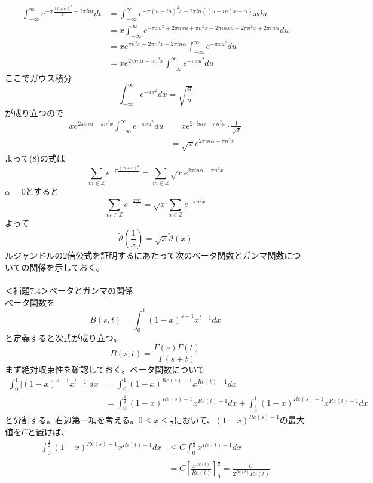 \documentclass{jsarticle}
\begin{document}
\begin{align*}
\int_{-\infty}^{\infty}e^{-\pi\frac{(t+\alpha)^2}{x}-2\pi int}dt&=\int_{-\infty}^{\infty}e^{-\pi(u-in)^{2}x-2\pi in\left\{(u-in)x-\alpha\right\}}xdu\\
&=x\int_{-\infty}^{\infty}e^{-\pi xu^{2}+2\pi nxu+\pi n^{2}x-2\pi inxu-2\pi n^{2}x+2\pi in\alpha}du\\
&=xe^{\pi n^{2}x-2\pi n^{2}x+2\pi in\alpha}\int_{-\infty}^{\infty}e^{-\pi xu^{2}}du\\
&=xe^{2\pi in\alpha-\pi n^{2}x}\int_{-\infty}^{\infty}e^{-\pi xu^{2}}du
\end{align*}
ここでガウス積分
\[\int_{-\infty}^{\infty}e^{-ax^2}dx=\sqrt{\frac{\pi}{a}}\]
が成り立つので
\begin{align*}
xe^{2\pi in\alpha-\pi n^{2}x}\int_{-\infty}^{\infty}e^{-\pi xu^{2}}du&=xe^{2\pi in\alpha-\pi n^{2}x}\cdot\frac{1}{\sqrt{x}}\\
&=\sqrt{x}e^{2\pi in\alpha-\pi n^{2}x}
\end{align*}
よって(8)の式は
\[
\sum_{m\in\mathbb{Z}}e^{-\pi\frac{(m+\alpha)^2}{x}}=\sum_{m\in\mathbb{Z}}\sqrt{x}e^{2\pi in\alpha-\pi n^{2}x}
\]
\(\alpha=0\)とすると
\[\sum_{m\in\mathbb{Z}}e^{-\frac{\pi m^2}{x}}=\sqrt{x}\sum_{n\in\mathbb{Z}}e^{-\pi n^{2}x}\]
よって
\[\tilde{\vartheta}\left(\frac{1}{x}\right)=\sqrt{x}\tilde{\vartheta}(x)\]
ルジャンドルの2倍公式を証明するにあたって次のベータ関数とガンマ関数についての関係を示しておく。\\
\\
＜補題7.4＞ベータとガンマの関係\\
ベータ関数を
\[B(s,t)=\int_{0}^{1}(1-x)^{s-1}x^{t-1}dx\]
と定義すると次式が成り立つ。
\begin{equation}
B(s,t)=\frac{\Gamma(s)\Gamma(t)}{\Gamma(s+t)}
\end{equation}
まず絶対収束性を確認しておく。ベータ関数について\\
\begin{align*}
\int_{0}^{1}\Biggl|(1-x)^{s-1}x^{t-1}\Biggr|dx&=\int_{0}^{1}(1-x)^{Re(s)-1}x^{Re(t)-1}dx\\
&=\int_{0}^{\frac{1}{2}}(1-x)^{Re(s)-1}x^{Re(t)-1}dx+\int_{\frac{1}{2}}^{1}(1-x)^{Re(s)-1}x^{Re(t)-1}dx
\end{align*}
と分割する。右辺第一項を考える。\(0\leq x\leq\frac{1}{2}\)において、\((1-x)^{Re(s)-1}\)の最大値を\(C\)と置けば、
\begin{align*}
\int_{0}^{\frac{1}{2}}(1-x)^{Re(s)-1}x^{Re(t)-1}dx&\leq C\int_{0}^{\frac{1}{2}}x^{Re(t)-1}dx\\
&=C\left[\frac{x^{Re(t)}}{Re(t)}\right]_{0}^{\frac{1}{2}}=\frac{C}{2^{Re(t)}Re(t)}
\end{align*}
\end{document}

